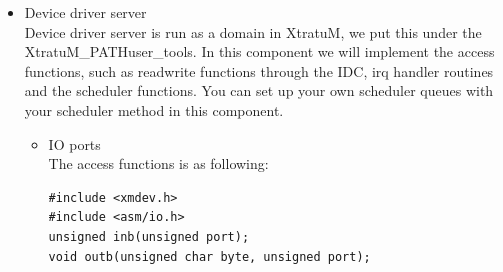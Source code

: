 \begin{itemize}
\begin{itemize}
\item{Device register}\\
The device driver register function in XtratuM is implemented in xmdev.c under directory XtratuM\_PATH\/kernel. 
\begin{verbatim}
#include <xmdev.h>
int xm_dev_register(int devid, xm_dev_t *dev);
int xm_dev_unregister(int devid);
\end{verbatim}
The devid here is the device driver number defined in the xmdev.h, you should add it when you implement your own device driver. dev is a structure of your device driver it defined the operations and parameters of your device drive. You should initialize it before you use it.
\begin{verbatim}
#include <xmdev.h>
typedef struct
xm_dev_struct
{
	int devid;
	int (*dev_map_handler)(unsigned long, unsigned long, 
			unsigned long, void *);
	int (*dev_unmap_handler)(unsigned long, unsigned long, 
			unsigned long);
	int (*dev_ioctl_handler)(unsigned long minor, 
			unsigned long cmd, void *);
	int client;
} xm_dev_t;
\end{verbatim}
This part only requires the resources from the system, and the handler routine will implement in device driver server domain.\\
So the pseudocode is like this:
\begin{verbatim}
xm_dev_t  xm_dev = {};
struct resource *dev_res;
int xm_devl_xm_init(void)
{
	 ();
	init_xm_dev_parameter();
	xm_mem_map();
	xm_dev_register();
	xm_request_irq();
}
void xm_serial_xm_exit(void)
{
	xm_free_irq();
	if(xm _dev.client > 0) {
		XMBUG();
		return;
	}
xm_dev_unregister();
	xm _mem_free();
	release_region();
}
\end{verbatim}
\end{itemize}

\item{Device driver server}
\\
Device driver server is run as a domain in XtratuM, we put this under the XtratuM\_PATH\/user\_tools. In this component we will implement the access functions, such as read\/write functions through the IDC, irq handler routines and the scheduler functions. You can set up your own scheduler queues with your scheduler method in this component.
\\
\begin{itemize}
\item{I\/O ports}
\\
The access functions is as following:
\begin{verbatim}
#include <xmdev.h>
#include <asm/io.h>
unsigned inb(unsigned port);
void outb(unsigned char byte, unsigned port);
\end{verbatim}


\end{itemize}
\end{itemize}
